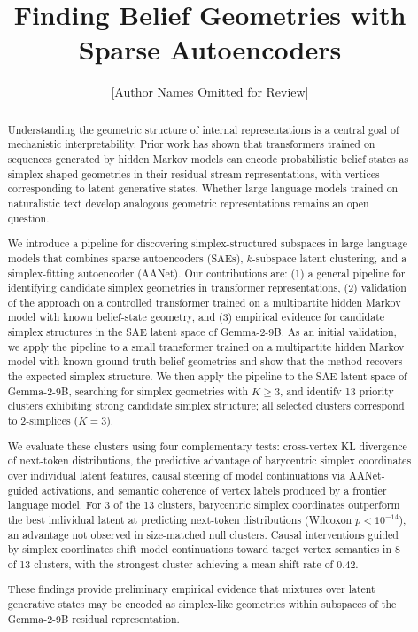 \documentclass{article}
\title{Finding Belief Geometries with Sparse Autoencoders}
\author{
  [Author Names Omitted for Review]
}
\date{}
\begin{document}
\maketitle

\begin{abstract}
Understanding the geometric structure of internal representations is a central goal of mechanistic interpretability.
Prior work has shown that transformers trained on sequences generated by hidden Markov models can encode probabilistic
belief states as simplex-shaped geometries in their residual stream representations, with vertices corresponding to
latent generative states. Whether large language models trained on naturalistic text develop analogous geometric
representations remains an open question.

We introduce a pipeline for discovering simplex-structured subspaces in large language models that combines sparse
autoencoders (SAEs), $k$-subspace latent clustering, and a simplex-fitting autoencoder (AANet). Our contributions are:
(1) a general pipeline for identifying candidate simplex geometries in transformer representations, (2) validation of
the approach on a controlled transformer trained on a multipartite hidden Markov model with known belief-state
geometry, and (3) empirical evidence for candidate simplex structures in the SAE latent space of Gemma-2-9B. As an
initial validation, we apply the pipeline to a small transformer trained on a multipartite hidden Markov model with
known ground-truth belief geometries and show that the method recovers the expected simplex structure. We then apply
the pipeline to the SAE latent space of Gemma-2-9B, searching for simplex geometries with $K \ge 3$, and identify 13
priority clusters exhibiting strong candidate simplex structure; all selected clusters correspond to 2-simplices
($K = 3$).

We evaluate these clusters using four complementary tests: cross-vertex KL divergence of next-token distributions,
the predictive advantage of barycentric simplex coordinates over individual latent features, causal steering of model
continuations via AANet-guided activations, and semantic coherence of vertex labels produced by a frontier language
model. For 3 of the 13 clusters, barycentric simplex coordinates outperform the best individual latent at predicting
next-token distributions (Wilcoxon $p < 10^{-14}$), an advantage not observed in size-matched null clusters. Causal
interventions guided by simplex coordinates shift model continuations toward target vertex semantics in 8 of 13
clusters, with the strongest cluster achieving a mean shift rate of 0.42.

These findings provide preliminary empirical evidence that mixtures over latent generative states may be encoded as
simplex-like geometries within subspaces of the Gemma-2-9B residual representation.
\end{abstract}
  
\end{document}
